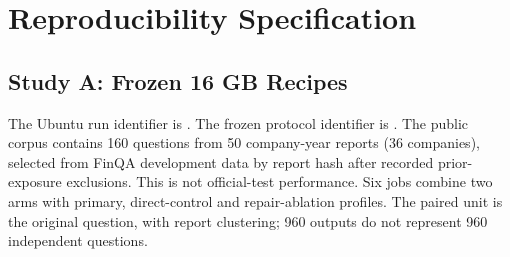 \documentclass[letterpaper]{article}
\begin{document}
\section{Reproducibility Specification}
\subsection{Study A: Frozen 16 GB Recipes}
The Ubuntu run identifier is . The frozen protocol identifier is . The public corpus contains 160 questions from 50 company-year reports (36 companies), selected from FinQA development data by report hash after recorded prior-exposure exclusions. This is not official-test performance. Six jobs combine two arms with primary, direct-control and repair-ablation profiles. The paired unit is the original question, with report clustering; 960 outputs do not represent 960 independent questions.
\end{document}
